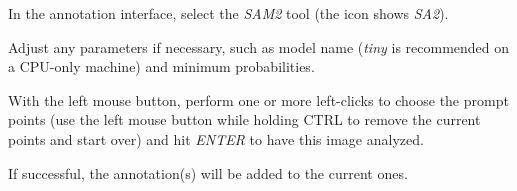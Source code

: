 \documentclass[a4paper]{book}
\begin{document}
\begin{tight_itemize}
  \item In the annotation interface, select the \textit{SAM2} tool (the icon shows \textit{SA2}).
  \item Adjust any parameters if necessary, such as model name (\textit{tiny} is recommended on a CPU-only machine)
  and minimum probabilities.
  \item With the left mouse button, perform one or more left-clicks to choose the prompt points (use the left mouse
  button while holding CTRL to remove the current points and start over) and hit \textit{ENTER} to have this image analyzed.
  \item If successful, the annotation(s) will be added to the current ones.
\end{tight_itemize}



\end{document}
